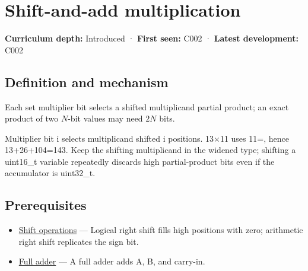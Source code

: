 \hypertarget{appendix-a65290d66ed9}{}\label{referencestart:appendix-a65290d66ed9}
\section{Shift-and-add multiplication}\label{appendix-a65290d66ed9-shift-and-add-multiplication}

\hypertarget{appendix-a65290d66ed9-shift-and-add-multiplication}{}

\textbf{Curriculum depth:} Introduced · \textbf{First seen:} C002 · \textbf{Latest development:} C002

\begin{allmightroledefinition}

\subsection{Definition and mechanism}\label{appendix-a65290d66ed9-definition-and-mechanism}

\hypertarget{appendix-a65290d66ed9-definition-and-mechanism}{}

Each set multiplier bit selects a shifted multiplicand partial product; an exact product of two \(N\)-bit values may need \(2N\) bits.

\end{allmightroledefinition}

Multiplier bit i selects multiplicand shifted i positions. 13×11 uses 11=, hence 13+26+104=143. Keep the shifting multiplicand in the widened type; shifting a uint16\_t variable repeatedly discards high partial-product bits even if the accumulator is uint32\_t.

\subsection{Prerequisites}\label{appendix-a65290d66ed9-prerequisites}

\hypertarget{appendix-a65290d66ed9-prerequisites}{}

\begin{itemize}
\tightlist
\item
  \hyperref[appendix-73425b25118e]{Shift operations} --- Logical right shift fills high positions with zero; arithmetic right shift replicates the sign bit.
\item
  \hyperref[appendix-d1a5b1e520c2]{Full adder} --- A full adder adds A, B, and carry-in.
\end{itemize}

